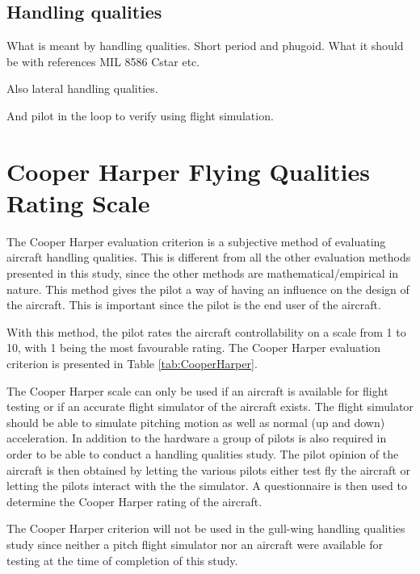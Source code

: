\documentclass{report}
\begin{document}
\subsection{Handling qualities}

What is meant by handling qualities. Short period and phugoid. What it should be with references
MIL 8586
Cstar etc.

Also lateral handling qualities.

And pilot in the loop to verify using flight simulation.


\section{Cooper Harper Flying Qualities Rating Scale}\label{Sec:  CooperHarperMethodExplain}


The Cooper Harper evaluation criterion \citep{CooperHarper} is a subjective method of evaluating aircraft handling qualities.  This is different from all the other evaluation methods presented in this study, since the other methods are mathematical/empirical in nature.  This method gives the pilot a way of having an influence on the design of the aircraft.  This is important since the pilot is the end user of the aircraft.

With this method, the pilot rates the aircraft controllability on a scale from 1 to 10, with 1 being the most favourable rating.  The Cooper Harper evaluation criterion is presented in Table \ref{tab:CooperHarper}.  

The Cooper Harper scale can only be used if an aircraft is available for flight testing or if an accurate flight simulator of the aircraft exists.  The flight simulator should be able to simulate pitching motion as well as normal (up and down) acceleration.  In addition to the hardware a group of pilots is also required in order to be able to conduct a handling qualities  study.  The pilot opinion of the aircraft is then obtained by letting the various pilots either test fly the aircraft or letting the pilots interact with the the simulator.  A questionnaire is then used to determine the Cooper Harper rating of the aircraft.

The Cooper Harper criterion will not be used in the gull-wing handling qualities study since neither a pitch flight simulator nor an aircraft were available for testing at the time of completion of this study.
\end{document}

